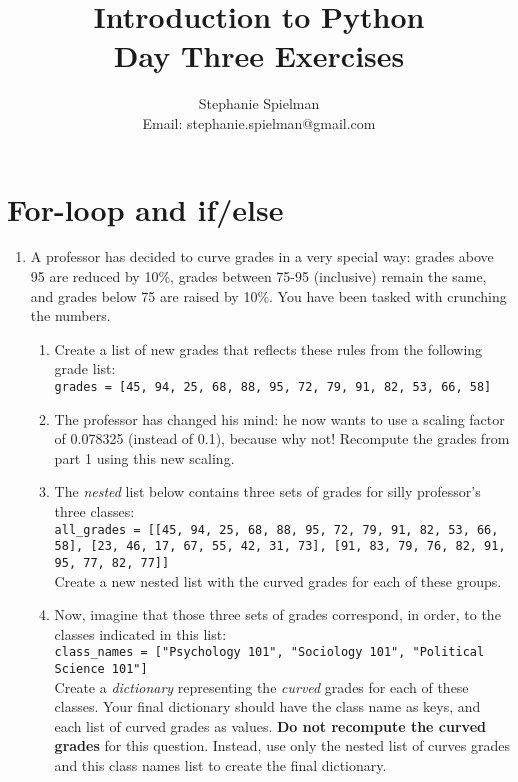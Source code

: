 \documentclass{article}[12pt]
\newcommand{\code}[1]{\texttt{#1}}  %
\begin{document}
\title{Introduction to Python \\ Day Three Exercises}
\author{Stephanie Spielman \\ \footnotesize{Email: stephanie.spielman@gmail.com}}
\date{}
\maketitle{}

		   
\section{For-loop and if/else}


\begin{enumerate}
	
	\item A professor has decided to curve grades in a very special way: grades above 95 are reduced by 10\%, grades between 75-95 (inclusive) remain the same, and grades below 75 are raised by 10\%. You have been tasked with crunching the numbers.
	
	\begin{enumerate}
		\item Create a list of new grades that reflects these rules from the following grade list: \\
		\code{grades = [45, 94, 25, 68, 88, 95, 72, 79, 91, 82, 53, 66, 58]} 
		
		\item The professor has changed his mind: he now wants to use a scaling factor of 0.078325 (instead of 0.1), because why not! Recompute the grades from part 1 using this new scaling. 
		 		
		\item The \emph{nested} list below contains three sets of grades for silly professor's three classes: \\ 
		\code{all\_grades = [[45, 94, 25, 68, 88, 95, 72, 79, 91, 82, 53, 66, 58], [23, 46, 17, 67, 55, 42, 31, 73], [91, 83, 79, 76, 82, 91, 95, 77, 82, 77]]}
		\\ Create a new nested list with the curved grades for each of these groups.
	    
	    \item Now, imagine that those three sets of grades correspond, in order, to the classes indicated in this list: \\
	    \code{class\_names = ["Psychology 101", "Sociology 101", "Political Science 101"]}
	    \\ Create a \emph{dictionary} representing the \emph{curved} grades for each of these classes. Your final dictionary should have the class name as keys, and each list of curved grades as values. \textbf{Do not recompute the curved grades} for this question. Instead, use only the nested list of curves grades and this class names list to create the final dictionary.
	

\end{enumerate}
\end{enumerate}
\end{document}
